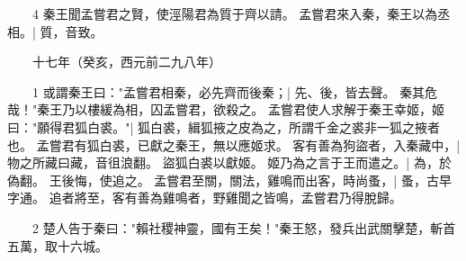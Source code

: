 　　4 秦王聞孟嘗君之賢，使涇陽君為質于齊以請。
	孟嘗君來入秦，秦王以為丞相。|{
	質，音致。
}

　　十七年（癸亥，西元前二九八年）

　　1 或謂秦王曰："孟嘗君相秦，必先齊而後秦；|{
	先、後，皆去聲。
}
秦其危哉！"秦王乃以樓緩為相，囚孟嘗君，欲殺之。
	孟嘗君使人求解于秦王幸姬，姬曰："願得君狐白裘。"|{
	狐白裘，緝狐掖之皮為之，所謂千金之裘非一狐之掖者也。
}
孟嘗君有狐白裘，已獻之秦王，無以應姬求。
	客有善為狗盜者，入秦藏中，|{
	物之所藏曰藏，音徂浪翻。
}
盜狐白裘以獻姬。
	姬乃為之言于王而遣之。|{
	為，於偽翻。
}
王後悔，使追之。
	孟嘗君至關，關法，雞鳴而出客，時尚蚤，|{
	蚤，古早字通。
}
追者將至，客有善為雞鳴者，野雞聞之皆鳴，孟嘗君乃得脫歸。


　　2 楚人告于秦曰："賴社稷神靈，國有王矣！"秦王怒，發兵出武關擊楚，斬首五萬，取十六城。


